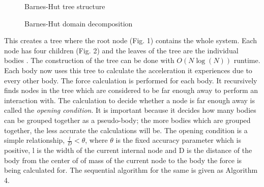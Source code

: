 \begin{figure}[thpb]
      \centering
      \caption{Barnes-Hut tree structure}
      \label{fig:1}
\end{figure}

\begin{figure}[thpb]
      \centering
      \caption{Barnes-Hut domain decomposition}
      \label{fig:2}
\end{figure}

This creates a tree where the root node (Fig. 1) contains the whole system. Each node has four children (Fig. 2) and the leaves of the tree are the individual bodies \cite{c9}. The construction of the tree can be done with  \(O(N\log(N))\) runtime. Each body now uses this tree to calculate the acceleration it experiences due to every other body. The force calculation is performed for each body. It recursively finds nodes in the tree which are considered to be far enough away to perform an interaction with. The calculation to decide whether a node is far enough away is called the \textit{opening condition}. It is important because it decides how many bodies can be grouped together as a pseudo-body; the more bodies which are grouped together, the less accurate the calculations will be. The opening condition is a simple relationship, \(\frac{l}{D} < \theta\), where \(\theta\) is the fixed accuracy parameter which is positive, l is the width of the current internal node and D is the distance of the body from the center of of mass of the current node to the body the force is being calculated for. The sequential algorithm for the same is given as Algorithm 4.

